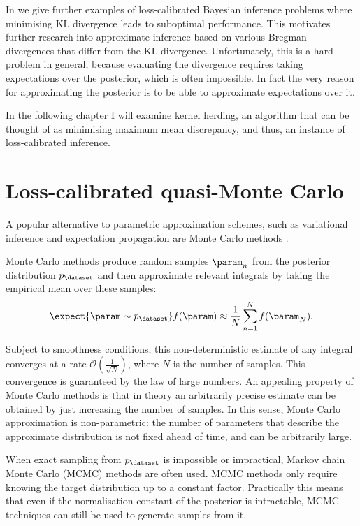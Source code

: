 In \citep{Lacoste2011} we give further examples of loss-calibrated Bayesian inference problems where minimising KL divergence leads to suboptimal performance. This motivates further research into approximate inference based on various Bregman divergences that differ from the KL divergence. Unfortunately, this is a hard problem in general, because evaluating the divergence requires taking expectations over the posterior, which is often impossible. In fact the very reason for approximating the posterior is to be able to approximate expectations over it.

In the following chapter I will examine kernel herding, an algorithm that can be thought of as minimising maximum mean discrepancy, and thus, an instance of loss-calibrated inference.

\section{Loss-calibrated quasi-Monte Carlo}

A popular alternative to parametric approximation schemes, such as variational inference and expectation propagation are Monte Carlo methods \citep[see \eg][]{Murray2007}.

Monte Carlo methods produce random samples $\param_n$ from the posterior distribution $p_\dataset$ and then approximate relevant integrals by taking the empirical mean over these samples:
%
\begin{equation}
	\expect{\param \sim p_{\dataset}} f(\param) \approx \frac{1}{N} \sum_{n = 1}^{N} f(\param_N).
\end{equation}

Subject to smoothness conditions, this non-deterministic estimate of any integral converges at a rate $\mathcal{O}(\frac{1}{\sqrt{N}})$, where $N$ is the number of samples. This convergence is guaranteed by the law of large numbers. An appealing property of Monte Carlo methods is that in theory an arbitrarily precise estimate can be obtained by just increasing the number of samples. In this sense, Monte Carlo approximation is non-parametric: the number of parameters that describe the approximate distribution is not fixed ahead of time, and can be arbitrarily large.

When exact sampling from $p_\dataset$ is impossible or impractical, Markov chain Monte Carlo (MCMC) methods are often used. MCMC methods only require knowing the target distribution up to a constant factor. Practically this means that even if the normalisation constant of the posterior is intractable, MCMC techniques can still be used to generate samples from it.

